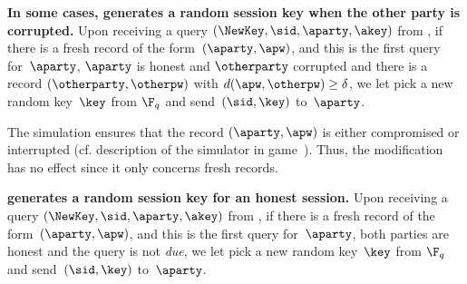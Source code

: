 \begin{games}
\textbf{In some cases, \Func generates a random session key when the other party is corrupted.}
Upon receiving a \NewKey query $(\NewKey,\sid,\aparty,\akey)$ from \Sim, if there is a fresh record of the form~$(\aparty,\apw)$, and this is the first \NewKey query for~$\aparty$, $\aparty$ is honest and $\otherparty$ corrupted and there is a record $(\otherparty,\otherpw)$ with $d(\apw,\otherpw)\geq\delta$, we let \Func pick a new random key~$\key$ from $\F_q$ and send~$(\sid,\key)$ to~$\aparty$. 

The simulation ensures that the record $(\aparty,\apw)$ is either compromised or interrupted (cf. description of the simulator in game~). Thus, the modification has no effect since it only concerns fresh records.

\textbf{\Func generates a random session key for an honest session.}
Upon receiving a \NewKey query $(\NewKey,\sid,\aparty,\akey)$ from \Sim, if there is a fresh record of the form~$(\aparty,\apw)$, and this is the first \NewKey query for~$\aparty$, both parties are honest and the \NewKey query is not \emph{due}, we let \Func pick a new random key~$\key$ from $\F_q$ and send~$(\sid,\key)$ to~$\aparty$. 


\end{games}
